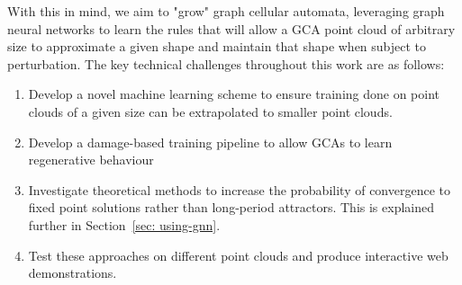 With this in mind, we aim to "grow" graph cellular automata, leveraging graph neural networks to learn the rules that will allow a GCA point cloud of arbitrary size to approximate a given shape and maintain that shape when subject to perturbation. The key technical challenges throughout this work are as follows:

\begin{enumerate}
    \item Develop a novel machine learning scheme to ensure training done on point clouds of a given size can be extrapolated to smaller point clouds.
    \item Develop a damage-based training pipeline to allow GCAs to learn regenerative behaviour
    \item Investigate theoretical methods to increase the probability of convergence to fixed point solutions rather than long-period attractors. This is explained further in Section~\ref{sec: using-gnn}.
    \item Test these approaches on different point clouds and produce interactive web demonstrations.
\end{enumerate}
